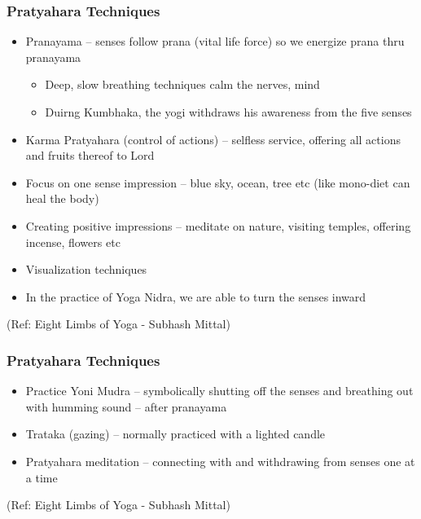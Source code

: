 \begin{frame}[fragile]\frametitle{Pratyahara Techniques}


	\begin{itemize}
	\item   Pranayama – senses follow prana (vital life force) so we energize 
prana thru pranayama
	\begin{itemize}

	\item    Deep, slow breathing techniques calm the nerves, mind
	\item    Duirng Kumbhaka, the yogi withdraws his awareness from the five 
senses
	\end{itemize}

	\item    Karma Pratyahara (control of actions) – selfless service, offering all 
actions and fruits thereof to Lord
	\item    Focus on one sense impression – blue sky, ocean, tree etc (like 
mono-diet can heal the body)
	\item    Creating positive impressions – meditate on nature, visiting 
temples, offering incense, flowers etc
	\item    Visualization techniques
	\item    In the practice of Yoga Nidra, we are able to turn the senses inward
	\end{itemize}

\tiny{(Ref: Eight Limbs of Yoga - Subhash Mittal)}

\end{frame}

\begin{frame}[fragile]\frametitle{Pratyahara Techniques}


	\begin{itemize}
	\item   Practice Yoni Mudra – symbolically shutting off 
the senses and breathing out with humming 
sound – after pranayama
	\item  Trataka (gazing) – normally practiced with a 
lighted candle
	\item   Pratyahara meditation – connecting with and 
withdrawing from senses one at a time
	\end{itemize}

\tiny{(Ref: Eight Limbs of Yoga - Subhash Mittal)}

\end{frame}

